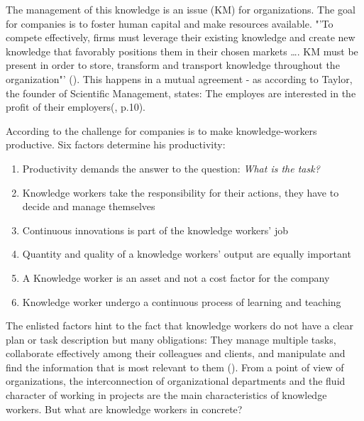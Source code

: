 The management of this knowledge is an issue (\ac{KM}) for organizations. The goal for companies is to foster human capital and make resources available.  "'To compete effectively, firms must leverage their existing knowledge and create new knowledge that favorably positions them in their chosen markets \dots. \acs{KM} must be present in order to store, transform and transport knowledge throughout the organization"' (\cite{gold2001knowledge}). This happens in a mutual agreement - as according to Taylor, the founder of Scientific Management, states: The employes are interested in the profit of their employers(\cite{taylor2013scientific}, p.10).

According to \cite{drucker1999knowledge} the challenge for companies is to make knowledge-workers productive. Six factors determine his productivity:
\begin{enumerate}
  \item Productivity demands the answer to the question: \textit{What is the task?}
  \item Knowledge workers take the responsibility for their actions, they have to decide and manage themselves
  \item Continuous innovations is part of the knowledge workers' job
  \item Quantity and quality of a knowledge workers' output are equally important
  \item A Knowledge worker is an asset and  not a cost factor for the company
  \item Knowledge worker undergo a continuous process of learning and teaching
\end{enumerate}


The enlisted factors hint to the fact that knowledge workers do not have a clear plan or task description but many obligations: They manage multiple tasks, collaborate effectively among their colleagues and clients, and manipulate and find the information that is most relevant to them (\cite{voida2002integrating}). From a point of view of organizations, the interconnection of organizational departments and the fluid character of working in projects are the main characteristics of knowledge workers. But what are knowledge workers in concrete? 

